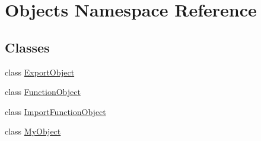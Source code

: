 \hypertarget{namespace_objects}{}\section{Objects Namespace Reference}
\label{namespace_objects}
\subsection*{Classes}
\begin{DoxyCompactItemize}
\item 
class \mbox{\hyperlink{class_objects_1_1_export_object}{Export\+Object}}
\item 
class \mbox{\hyperlink{class_objects_1_1_function_object}{Function\+Object}}
\item 
class \mbox{\hyperlink{class_objects_1_1_import_function_object}{Import\+Function\+Object}}
\item 
class \mbox{\hyperlink{class_objects_1_1_my_object}{My\+Object}}
\end{DoxyCompactItemize}
